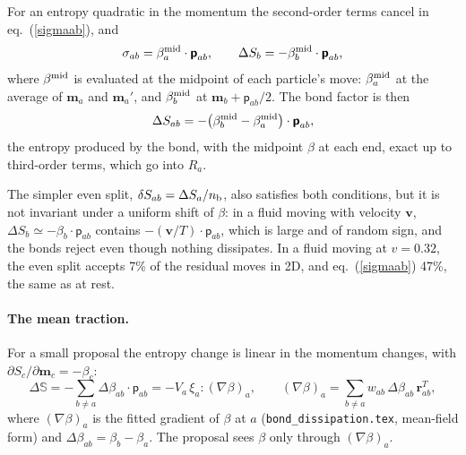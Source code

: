 \documentclass[11pt,aps,preprint,nofootinbib,superscriptaddress,tightenlines]{revtex4-2}
\def\st{\begin{equation}}
\def\stp{\end{equation}}
\def\Eq#1{eq.~(\ref{#1})}
\newcommand{\pf}{\bm{\mathsf p}}
\let\oldparagraph\paragraph
\renewcommand{\paragraph}{\par\bigskip\oldparagraph}
\begin{document}
For an entropy quadratic in the momentum the second-order terms
cancel in \Eq{sigmaab}, and
\st
\sigma_{ab}=\beta_a^{\rm mid}\cdot\pf_{ab},\qquad
\Delta S_b=-\beta_b^{\rm mid}\cdot\pf_{ab},
\stp
where $\beta^{\rm mid}$ is evaluated at the midpoint of each particle's move:
$\beta_a^{\rm mid}$ at the average of $\bm m_a$ and $\bm m_a'$, and $\beta_b^{\rm mid}$ at
$\bm m_b+\pf_{ab}/2$.  The bond factor is then
\st
\Delta S_{ab}=-\big(\beta_b^{\rm mid}-\beta_a^{\rm mid}\big)\cdot\pf_{ab} ,
\stp
the entropy produced by the bond, with the midpoint $\beta$ at each end, exact up
to third-order terms, which go into $R_a$.

The simpler even split, $\delta S_{ab}=\Delta S_a/n_{\rm b}$, also satisfies both
conditions, but it
is not invariant under a uniform shift of $\beta$: in a fluid moving with
velocity $\bm v$, $\Delta S_b\simeq-\beta_b\cdot\pf_{ab}$ contains $-(\bm v/T)\cdot\pf_{ab}$,
which is large and of random sign, and the bonds reject even though nothing
dissipates.  In a fluid moving at $v=0.32$, the even split accepts 7\% of the
residual moves in 2D, and \Eq{sigmaab} 47\%, the same as at rest.

\paragraph{The mean traction.}  For a small proposal the entropy change is
linear in the momentum changes, with $\partial S_c/\partial\bm m_c=-\beta_c$:
\st
\Delta\mathbb S=-\sum_{b\neq a}\Delta\beta_{ab}\cdot\pf_{ab}
=-V_a\,\xi_a{:}(\nabla\beta)_a,\qquad
(\nabla\beta)_a=\sum_{b\neq a}w_{ab}\,\Delta\beta_{ab}\,\bm r_{ab}^T ,
\stp
where $(\nabla\beta)_a$ is the fitted gradient of $\beta$ at $a$
(\texttt{bond\_dissipation.tex}, mean-field form) and $\Delta\beta_{ab}=\beta_b-\beta_a$.  The proposal sees $\beta$ only
through $(\nabla\beta)_a$.
\end{document}
